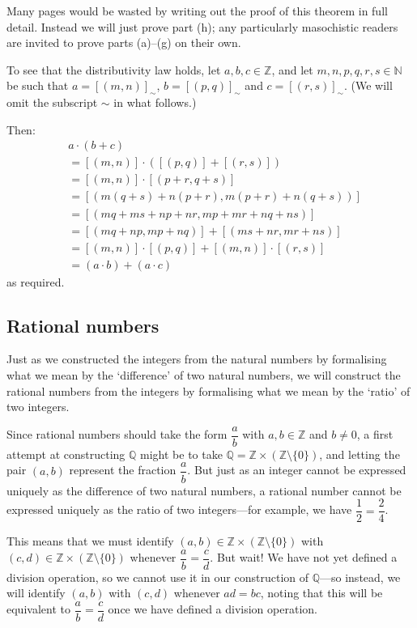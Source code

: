 \begin{cproof}
Many pages would be wasted by writing out the proof of this theorem in full detail. Instead we will just prove part (h); any particularly masochistic readers are invited to prove parts (a)--(g) on their own.

To see that the distributivity law holds, let $a,b,c \in \mathbb{Z}$, and let $m,n,p,q,r,s \in \mathbb{N}$ be such that $a = [(m,n)]_{\sim}$, $b = [(p,q)]_{\sim}$ and $c = [(r,s)]_{\sim}$. (We will omit the subscript $\sim$ in what follows.)

Then:
\begin{align*}
& a \cdot (b + c) \\
&= [(m,n)] \cdot ([(p,q)] + [(r,s)]) \\
&= [(m,n)] \cdot [(p+r,q+s)] \\
&= [(m(q+s)+n(p+r), m(p+r) + n(q+s))] \\
&= [(mq+ms+np+nr, mp+mr+nq+ns)] \\
&= [(mq+np, mp+nq)] + [(ms+nr, mr+ns)] \\
&= [(m,n)] \cdot [(p,q)] + [(m,n)] \cdot [(r,s)] \\
&= (a \cdot b) + (a \cdot c)
\end{align*}
as required.
\end{cproof}

\subsection*{Rational numbers}

Just as we constructed the integers from the natural numbers by formalising what we mean by the `difference' of two natural numbers, we will construct the rational numbers from the integers by formalising what we mean by the `ratio' of two integers.

Since rational numbers should take the form $\dfrac{a}{b}$ with $a,b \in \mathbb{Z}$ and $b \ne 0$, a first attempt at constructing $\mathbb{Q}$ might be to take $\mathbb{Q} = \mathbb{Z} \times (\mathbb{Z} \setminus \{ 0 \})$, and letting the pair $(a,b)$ represent the fraction $\dfrac{a}{b}$. But just as an integer cannot be expressed uniquely as the difference of two natural numbers, a rational number cannot be expressed uniquely as the ratio of two integers---for example, we have $\dfrac{1}{2} = \dfrac{2}{4}$.

This means that we must identify $(a,b) \in \mathbb{Z} \times (\mathbb{Z} \setminus \{ 0 \})$ with $(c,d) \in \mathbb{Z} \times (\mathbb{Z} \setminus \{ 0 \})$ whenever $\dfrac{a}{b} = \dfrac{c}{d}$. But wait! We have not yet defined a division operation, so we cannot use it in our construction of $\mathbb{Q}$---so instead, we will identify $(a,b)$ with $(c,d)$ whenever $ad=bc$, noting that this will be equivalent to $\dfrac{a}{b} = \dfrac{c}{d}$ once we have defined a division operation.

